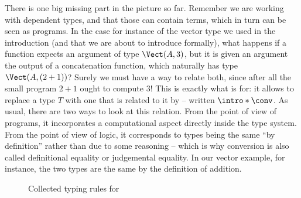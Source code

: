 \AP There is one big missing part in the picture so far. Remember we are working with
dependent types, and that those can contain terms, which in turn can be seen as programs.
In the case for instance of the vector type we used in the introduction (and that we are
about to introduce formally), what happens if a function expects an argument of type
$\Vect(A,3)$, but it is given an argument the output of a concatenation function,
which naturally has type $\Vect(A,(2+1))$?
Surely we must have a way to relate both, since after all
the small program $2+1$ ought to compute $3$! This is exactly what
%
is for: it allows to replace a type $T$ with one that is related to it by
 – written $\intro*\conv$.
As usual, there are two ways to look at this relation. From the point of view of programs,
it incorporates a computational aspect directly inside the type system.
From the point of view of logic, it corresponds to types being the same “by definition”
rather than due to some reasoning
– which is why conversion is also called definitional equality or judgemental equality.
In our vector example, for instance, the two types are the same by the definition of addition.

\begin{figure*}[ht]
  \LastFloat


  \caption{Collected typing rules for }
  \label{fig:ccw-typing}
\end{figure*}

